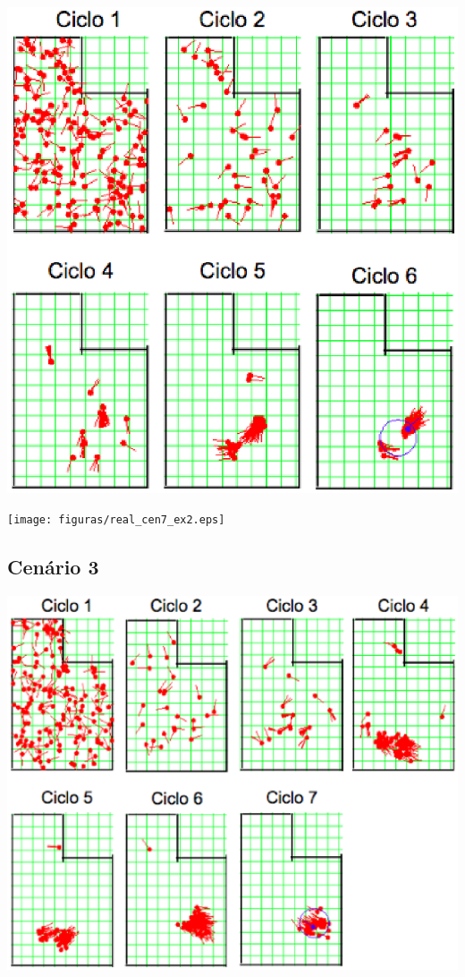 {\centering
\includegraphics[scale=0.4]{figuras/cen7_ex2.eps}
\label{img:cen7_ex2}
\par}

{\centering
\texttt{[image: figuras/real\_cen7\_ex2.eps]}
\label{img:real_cen7_ex2}
\par}

\subsection{Cenário 3}

{\centering
\includegraphics[scale=0.4]{figuras/cen7_ex3.eps}
\label{img:cen7_ex3}
\par}

